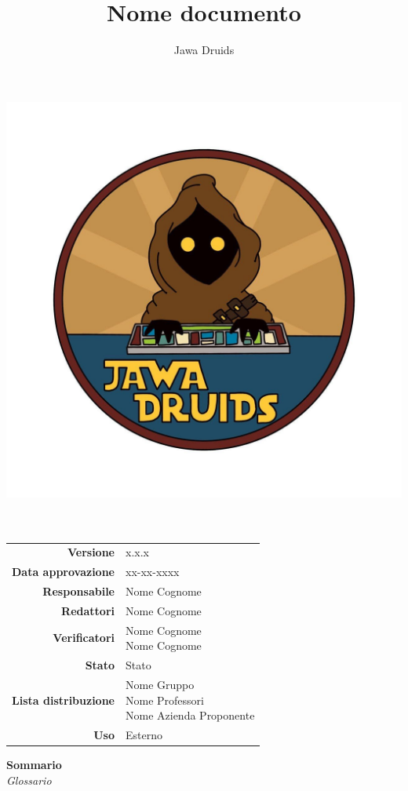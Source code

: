 




\makeatletter
\begin{titlepage}
	\begin{center}
		\vspace*{-5cm}
		\author{Jawa Druids} 
		\title{Nome documento}
		\date{} %
		\includegraphics[width=0.7\linewidth]{../immagini/DRUIDSLOGO.jpg}\\[4ex]
		{\huge \bfseries  \@title }\\[2ex] 
		{\LARGE  \@author}\\[50ex]
		\vspace*{-9cm}
		\begin{table}[H]
			\renewcommand{\arraystretch}{1.4}
			\centering
			\begin{tabular}{r | l}
				\textbf{Versione} & x.x.x \\%
				\textbf{Data approvazione} & xx-xx-xxxx\\
				\textbf{Responsabile} & Nome Cognome\\
				\textbf{Redattori} & Nome Cognome \\
				\textbf{Verificatori} & \makecell[tl]{Nome Cognome \\ Nome Cognome} \\
				\textbf{Stato} & Stato\\
				\textbf{Lista distribuzione} & \makecell[tl]{Nome Gruppo \\ Nome Professori \\ Nome Azienda Proponente}\\
				\textbf{Uso} & Esterno            
			\end{tabular}
		\end{table}
		\vspace{0.1cm}
		\hfill \break
		\fontsize{17}{10}\textbf{Sommario} \\
		\vspace{0.1cm}
		\textit{Glossario} 
	\end{center}
\end{titlepage}
\makeatother

